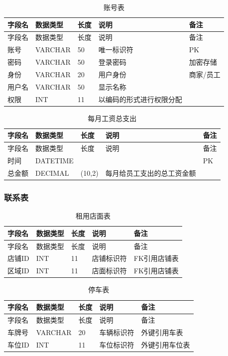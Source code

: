 \documentclass[]{article}
\begin{document}
\begin{longtable}[]{@{}lllll@{}}
\caption{账号表}\\
\toprule
字段名 & 数据类型 & 长度 & 说明 & 备注 \\
\midrule
\endfirsthead
\toprule
字段名 & 数据类型 & 长度 & 说明 & 备注 \\
\midrule
\endhead
账号 & VARCHAR & 50 & 唯一标识符 & PK \\
密码 & VARCHAR & 50 & 登录密码 & 加密存储 \\
身份 & VARCHAR & 20 & 用户身份 & 商家/员工 \\
用户名 & VARCHAR & 50 & 显示名称 & \\
权限 & INT & 11 & 以编码的形式进行权限分配 & \\
\bottomrule
\end{longtable}

\begin{longtable}[]{@{}lllll@{}}
\caption{每月工资总支出}\\
\toprule
字段名 & 数据类型 & 长度 & 说明 & 备注 \\
\midrule
\endfirsthead
\toprule
字段名 & 数据类型 & 长度 & 说明 & 备注 \\
\midrule
\endhead
时间 & DATETIME &  &  & PK \\
总金额 & DECIMAL & (10,2) & 每月给员工支出的总工资金额 & \\
\bottomrule
\end{longtable}

\hypertarget{ux8054ux7cfbux8868}{%
\subsubsection{联系表}\label{ux8054ux7cfbux8868}}

\begin{longtable}[]{@{}lllll@{}}
\caption{租用店面表}\\
\toprule
字段名 & 数据类型 & 长度 & 说明 & 备注 \\
\midrule
\endfirsthead
\toprule
字段名 & 数据类型 & 长度 & 说明 & 备注 \\
\midrule
\endhead
店铺ID & INT & 11 & 店铺标识符 & FK引用店铺表 \\
区域ID & INT & 11 & 店面标识符 & FK引用店铺表 \\
\bottomrule
\end{longtable}

\begin{longtable}[]{@{}lllll@{}}
\caption{停车表}\\
\toprule
字段名 & 数据类型 & 长度 & 说明 & 备注 \\
\midrule
\endfirsthead
\toprule
字段名 & 数据类型 & 长度 & 说明 & 备注 \\
\midrule
\endhead
车牌号 & VARCHAR & 20 & 车辆标识符 & 外键引用车表 \\
车位ID & INT & 11 & 车位标识符 & 外键引用车位表 \\
\bottomrule
\end{longtable}
\end{document}
